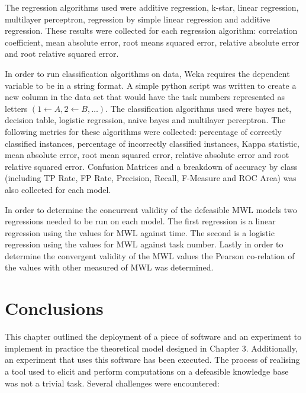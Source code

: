 The regression algorithms used were additive regression, k-star, linear regression, multilayer perceptron, regression by simple linear regression and additive regression. These results were collected for each regression algorithm: correlation coefficient, mean absolute error, root means squared error, relative absolute error and root relative squared error.

In order to run classification algorithms on data, Weka requires the dependent variable to be in a string format. A simple python script was written to create a new column in the data set that would have the task numbers represented as letters $(1 \leftarrow A, 2 \leftarrow B, \ldots)$.
The classification algorithms used were bayes net, decision table, logistic regression, naive bayes and multilayer perceptron. The following metrics for these algorithms were collected: percentage of correctly classified instances, percentage of incorrectly classified instances, Kappa statistic, mean absolute error, root mean squared error, relative absolute error and root relative squared error. Confusion Matrices and a breakdown of accuracy by class (including TP Rate, FP Rate, Precision, Recall, F-Measure and ROC Area) was also collected for each model.

In order to determine the concurrent validity of the defeasible MWL models two regressions needed to be run on each model. The first regression is a linear regression using the values for MWL against time. The second is a logistic regression using the values for MWL against task number. Lastly in order to determine the convergent validity of the MWL values the Pearson co-relation of the values with other measured of MWL was determined.

\section{Conclusions}

This chapter outlined the deployment of a piece of software and an experiment to implement in practice the theoretical model designed in Chapter 3. Additionally, an experiment that uses this software has been executed. The process of realising a tool used to elicit and perform computations on a defeasible knowledge base was not a trivial task. Several challenges were encountered: 


